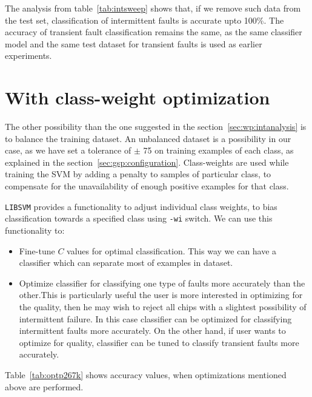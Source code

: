 The analysis from table~\ref{tab:intsweep} shows that, if we remove such data from the test set, classification of intermittent faults is accurate upto 100\%. The accuracy of transient fault classification remains the same, as the same classifier model and the same test dataset for transient faults is used as earlier experiments.

\section{With class-weight optimization}
\label{sec:ww}
The other possibility than the one suggested in the section~\ref{sec:wp:intanalysis} is to balance the training dataset. An unbalanced dataset is a possibility in our case, as we have set a tolerance of $\pm$ 75 on training examples of each class, as explained in the section~\ref{sec:gsp:configuration}. Class-weights are used while training the SVM by adding a penalty to samples of particular class, to compensate for the unavailability of enough positive examples for that class.

\texttt{LIBSVM} provides a functionality to adjust individual class weights, to bias classification towards a specified class using \texttt{-wi} switch. We can use this functionality to:
\begin{itemize}
  \item Fine-tune $C$ values for optimal classification. This way we can have a classifier which can separate most of examples in dataset.
  \item Optimize classifier for classifying one type of faults more accurately than the other.This is particularly useful the user is more interested in optimizing for the quality, then he may wish to reject all chips with a slightest possibility of intermittent failure. In this case classifier can be optimized for classifying intermittent faults more accurately. On the other hand, if user wants to optimize for quality, classifier can be tuned to classify transient faults more accurately.
\end{itemize}  

Table~\ref{tab:optp267k} shows accuracy values, when optimizations mentioned above are performed.

